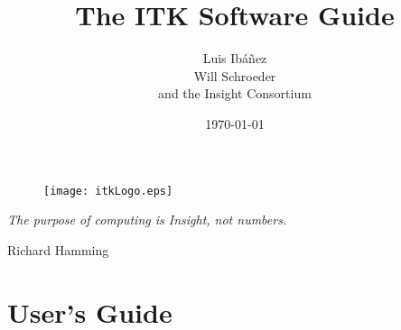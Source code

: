 \documentclass{InsightSoftwareGuide}
\title{The ITK Software Guide}
\author{Luis Ib\'{a}\~{n}ez\\Will Schroeder\\and the Insight Consortium}
\date{\today}
\newif\ifitkFullVersion
\begin{document}
\maketitle

\frontmatter




%
%
\newpage
\vspace{6cm}
\begin{figure}
\center
\texttt{[image: itkLogo.eps]}
\end{figure}

\vspace{5cm}
\large
\begin{center}
\emph{The purpose of computing is Insight, not numbers.}\\
\end{center}
\hspace{8cm} Richard Hamming
\normalsize

\newpage




\ifitkFullVersion 


\fi

%
%

\small
\tableofcontents
\listoffigures
\listoftables
\normalsize


% 
% 

\mainmatter

\ifitkFullVersion
\part{Introduction}




\fi


\part{User's Guide}

\ifitkFullVersion

\fi

\ifitkFullVersion

\fi
\end{document}
